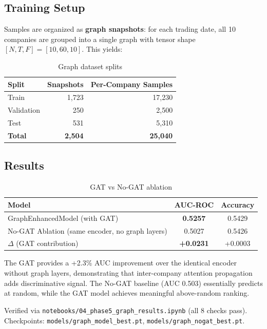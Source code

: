 \documentclass[12pt,a4paper]{article}
\begin{document}
\subsection{Training Setup}

Samples are organized as \textbf{graph snapshots}: for each trading date, all 10 companies are grouped into a single graph with tensor shape $[N, T, F] = [10, 60, 10]$. This yields:

\begin{table}[H]
\centering
\begin{tabular}{lrr}
\toprule
\textbf{Split} & \textbf{Snapshots} & \textbf{Per-Company Samples} \\
\midrule
Train & 1,723 & 17,230 \\
Validation & 250 & 2,500 \\
Test & 531 & 5,310 \\
\midrule
\textbf{Total} & \textbf{2,504} & \textbf{25,040} \\
\bottomrule
\end{tabular}
\caption{Graph dataset splits}
\label{tab:graph_splits}
\end{table}

\subsection{Results}

\begin{table}[H]
\centering
\begin{tabular}{lcc}
\toprule
\textbf{Model} & \textbf{AUC-ROC} & \textbf{Accuracy} \\
\midrule
GraphEnhancedModel (with GAT) & \textbf{0.5257} & 0.5429 \\
No-GAT Ablation (same encoder, no graph layers) & 0.5027 & 0.5426 \\
\midrule
$\Delta$ (GAT contribution) & \textbf{+0.0231} & +0.0003 \\
\bottomrule
\end{tabular}
\caption{GAT vs No-GAT ablation}
\label{tab:gat_ablation}
\end{table}

\noindent The GAT provides a +2.3\% AUC improvement over the identical encoder without graph layers, demonstrating that inter-company attention propagation adds discriminative signal. The No-GAT baseline (AUC 0.503) essentially predicts at random, while the GAT model achieves meaningful above-random ranking.

\noindent Verified via \texttt{notebooks/04\_phase5\_graph\_results.ipynb} (all 8 checks pass). Checkpoints: \texttt{models/graph\_model\_best.pt}, \texttt{models/graph\_nogat\_best.pt}.
\end{document}

